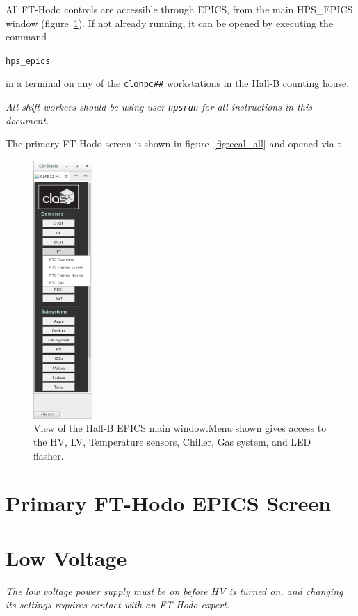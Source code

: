 \documentclass[12pt]{article}
\begin{document}
All FT-Hodo controls are accessible through EPICS, from the main HPS\_EPICS window (figure~\ref{EPICSmain}).  If not already running, it can be opened by executing
the command \begin{center}\texttt{hps\_epics}\end{center} in a terminal on any of
the \texttt{clonpc\#\#} workstations in the Hall-B counting house.

{\em   All shift workers should be using user \texttt{hpsrun} for all instructions in this document.}

The primary FT-Hodo screen is shown in figure~\ref{fig:ecal_all} and opened via t
\begin{figure}[h!]
\center
\includegraphics[width=0.20\textwidth]{Images/clascss_main_menu_FT_selection.png}
\caption{ \label{EPICSmain} View of the Hall-B EPICS main window.Menu shown gives access to the HV, LV, Temperature sensors, Chiller, Gas system, and LED flasher.}
\end{figure}
\section{Primary FT-Hodo EPICS Screen}

\newpage

\section{Low Voltage}
{\em The low voltage power supply must be on before HV is turned on, and changing its settings requires contact with an FT-Hodo-expert.}
      
\end{document}
